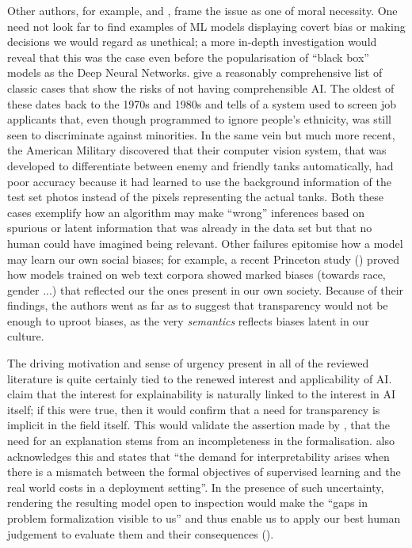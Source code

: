 Other authors, for example, \cite{doshi2017towards} and \cite{guidotti2018survey}, frame the issue as one of moral necessity.
One need not look far to find examples of ML models displaying covert bias or making decisions we would regard as unethical; a more in-depth investigation would reveal that this was the case even before the popularisation of \enquote{black box} models as the Deep Neural Networks.
\cite{guidotti2018survey} give a reasonably comprehensive list of classic cases that show the risks of not having comprehensible AI.
The oldest of these dates back to the 1970s and 1980s and tells of a system used to screen job applicants that, even though programmed to ignore people's ethnicity, was still seen to discriminate against minorities.
In the same vein but much more recent, the American Military discovered that their computer vision system, that was developed to differentiate between enemy and friendly tanks automatically, had poor accuracy because it had learned to use the background information of the test set photos instead of the pixels representing the actual tanks.
Both these cases exemplify how an algorithm may make \enquote{wrong} inferences based on spurious or latent information that was already in the data set but that no human could have imagined being relevant.
Other failures epitomise how a model may learn our own social biases; for example, a recent Princeton study (\cite{caliskan2017semantics}) proved how models trained on web text corpora showed marked biases (towards race, gender ...) that reflected our the ones present in our own society.
Because of their findings, the authors went as far as to suggest that transparency would not be enough to uproot biases, as the very \textit{semantics} reflects biases latent in our culture. 

The driving motivation and sense of urgency present in all of the reviewed literature is quite certainly tied to the renewed interest and applicability of AI.
\cite{Preece2018} claim that the interest for explainability is naturally linked to the interest in AI itself; if this were true, then it would confirm that a need for transparency is implicit in the field itself.
This would validate the assertion made by \cite{doshi2017towards}, that the need for an explanation stems from an incompleteness in the formalisation.
\cite{Lipton2016} also acknowledges this and states that \enquote{the demand for interpretability arises when there is a mismatch between the formal objectives of supervised learning and the real world costs in a deployment setting}.
In the presence of such uncertainty, rendering the resulting model open to inspection would make the \enquote{gaps in problem formalization visible to us} and thus enable us to apply our best human judgement to evaluate them and their consequences (\cite{doshi2017towards}).


